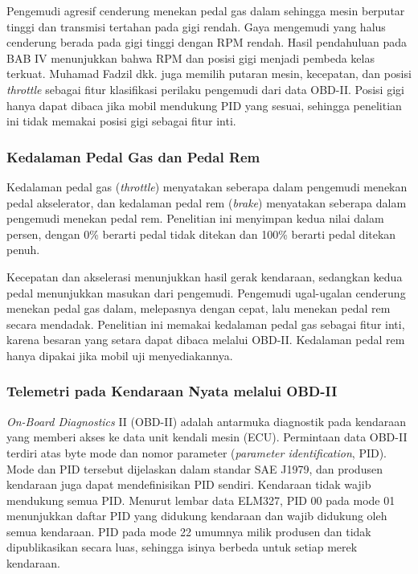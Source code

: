 Pengemudi agresif cenderung menekan pedal gas dalam sehingga mesin berputar tinggi dan transmisi tertahan pada gigi rendah. Gaya mengemudi yang halus cenderung berada pada gigi tinggi dengan RPM rendah. Hasil pendahuluan pada BAB IV menunjukkan bahwa RPM dan posisi gigi menjadi pembeda kelas terkuat. Muhamad Fadzil dkk. juga memilih putaran mesin, kecepatan, dan posisi \textit{throttle} sebagai fitur klasifikasi perilaku pengemudi dari data OBD-II. Posisi gigi hanya dapat dibaca jika mobil mendukung PID yang sesuai, sehingga penelitian ini tidak memakai posisi gigi sebagai fitur inti.

\subsubsection{Kedalaman Pedal Gas dan Pedal Rem}
Kedalaman pedal gas (\textit{throttle}) menyatakan seberapa dalam pengemudi menekan pedal akselerator, dan kedalaman pedal rem (\textit{brake}) menyatakan seberapa dalam pengemudi menekan pedal rem. Penelitian ini menyimpan kedua nilai dalam persen, dengan 0\% berarti pedal tidak ditekan dan 100\% berarti pedal ditekan penuh.

Kecepatan dan akselerasi menunjukkan hasil gerak kendaraan, sedangkan kedua pedal menunjukkan masukan dari pengemudi. Pengemudi ugal-ugalan cenderung menekan pedal gas dalam, melepasnya dengan cepat, lalu menekan pedal rem secara mendadak. Penelitian ini memakai kedalaman pedal gas sebagai fitur inti, karena besaran yang setara dapat dibaca melalui OBD-II. Kedalaman pedal rem hanya dipakai jika mobil uji menyediakannya.


\subsubsection{Telemetri pada Kendaraan Nyata melalui OBD-II}
\label{subsec:obd}
\textit{On-Board Diagnostics} II (OBD-II) adalah antarmuka diagnostik pada kendaraan yang memberi akses ke data unit kendali mesin (ECU). Permintaan data OBD-II terdiri atas byte mode dan nomor parameter (\textit{parameter identification}, PID). Mode dan PID tersebut dijelaskan dalam standar SAE J1979, dan produsen kendaraan juga dapat mendefinisikan PID sendiri. Kendaraan tidak wajib mendukung semua PID. Menurut lembar data ELM327, PID 00 pada mode 01 menunjukkan daftar PID yang didukung kendaraan dan wajib didukung oleh semua kendaraan. PID pada mode 22 umumnya milik produsen dan tidak dipublikasikan secara luas, sehingga isinya berbeda untuk setiap merek kendaraan.

